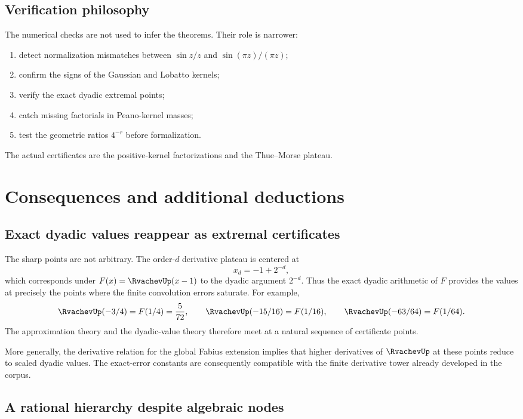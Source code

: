 \documentclass[11pt]{article}
\numberwithin{equation}{section}
\theoremstyle{definition}
\theoremstyle{remark}
\begin{document}
\subsection{Verification philosophy}

The numerical checks are not used to infer the theorems.  Their role is narrower:
\begin{enumerate}
\item detect normalization mismatches between $\sin z/z$ and $\sin(\pi z)/(\pi z)$;
\item confirm the signs of the Gaussian and Lobatto kernels;
\item verify the exact dyadic extremal points;
\item catch missing factorials in Peano-kernel masses;
\item test the geometric ratios $4^{-r}$ before formalization.
\end{enumerate}
The actual certificates are the positive-kernel factorizations and the Thue--Morse plateau.

\section{Consequences and additional deductions}
\label{p1:sec:consequences}

\subsection{Exact dyadic values reappear as extremal certificates}

The sharp points are not arbitrary.  The order-$d$ derivative plateau is centered at
\[
 x_d=-1+2^{-d},
\]
which corresponds under $F(x)=\RvachevUp(x-1)$ to the dyadic argument $2^{-d}$.  Thus the exact dyadic arithmetic of $F$ provides the values at precisely the points where the finite convolution errors saturate.  For example,
\[
 \RvachevUp(-3/4)=F(1/4)=\frac5{72},
 \qquad
 \RvachevUp(-15/16)=F(1/16),
 \qquad
 \RvachevUp(-63/64)=F(1/64).
\]
The approximation theory and the dyadic-value theory therefore meet at a natural sequence of certificate points.

More generally, the derivative relation for the global Fabius extension implies that higher derivatives of $\RvachevUp$ at these points reduce to scaled dyadic values.  The exact-error constants are consequently compatible with the finite derivative tower already developed in the corpus.

\subsection{A rational hierarchy despite algebraic nodes}
\end{document}
